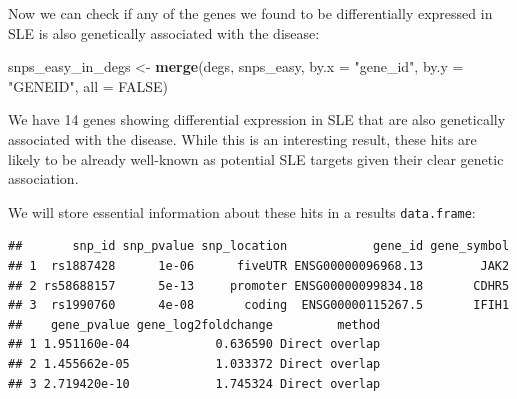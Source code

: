 \documentclass[9pt,a4paper,]{extarticle}
\newenvironment{Shaded}{\begin{snugshade}}{\end{snugshade}}
\newcommand{\KeywordTok}[1]{\textcolor[rgb]{0.13,0.29,0.53}{\textbf{#1}}}
\newcommand{\DataTypeTok}[1]{\textcolor[rgb]{0.13,0.29,0.53}{#1}}
\newcommand{\DecValTok}[1]{\textcolor[rgb]{0.00,0.00,0.81}{#1}}
\newcommand{\StringTok}[1]{\textcolor[rgb]{0.31,0.60,0.02}{#1}}
\newcommand{\OtherTok}[1]{\textcolor[rgb]{0.56,0.35,0.01}{#1}}
\newcommand{\OperatorTok}[1]{\textcolor[rgb]{0.81,0.36,0.00}{\textbf{#1}}}
\newcommand{\NormalTok}[1]{#1}
\theoremstyle{definition}
\theoremstyle{definition}
\theoremstyle{definition}
\theoremstyle{remark}
\begin{document}
Now we can check if any of the genes we found to be differentially expressed in SLE is also genetically associated with the disease:

\begin{Shaded}
\begin{Highlighting}[]
\NormalTok{snps_easy_in_degs <-}\StringTok{ }\KeywordTok{merge}\NormalTok{(degs, snps_easy, }\DataTypeTok{by.x =} \StringTok{"gene_id"}\NormalTok{, }\DataTypeTok{by.y =} \StringTok{"GENEID"}\NormalTok{, }\DataTypeTok{all =} \OtherTok{FALSE}\NormalTok{)}
\end{Highlighting}
\end{Shaded}

We have 14 genes showing differential expression in SLE that are also genetically associated with the disease.
While this is an interesting result, these hits are likely to be already well-known as potential SLE targets given their clear genetic association.

We will store essential information about these hits in a results \texttt{data.frame}:

\begin{Shaded}
\end{Shaded}

\begin{verbatim}
##       snp_id snp_pvalue snp_location            gene_id gene_symbol
## 1  rs1887428      1e-06      fiveUTR ENSG00000096968.13        JAK2
## 2 rs58688157      5e-13     promoter ENSG00000099834.18       CDHR5
## 3  rs1990760      4e-08       coding  ENSG00000115267.5       IFIH1
##    gene_pvalue gene_log2foldchange         method
## 1 1.951160e-04            0.636590 Direct overlap
## 2 1.455662e-05            1.033372 Direct overlap
## 3 2.719420e-10            1.745324 Direct overlap
\end{verbatim}
\end{document}
